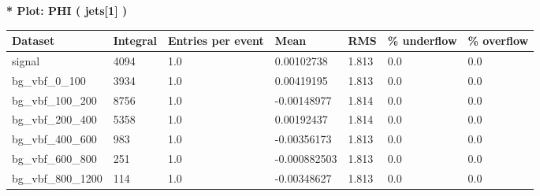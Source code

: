 \documentclass[a4paper, 10pt]{article}
\begin{document}
\textbf{* Plot: PHI ( jets[1] ) }\\
   \begin{table}[H]
  \begin{center}
    \begin{tabular}{|m{23.0mm}|m{23.0mm}|m{18.0mm}|m{19.0mm}|m{19.0mm}|m{19.0mm}|m{19.0mm}|}
      \hline
      {\cellcolor{yellow}         Dataset}& {\cellcolor{yellow}         Integral}& {\cellcolor{yellow}         Entries per event}& {\cellcolor{yellow}         Mean}& {\cellcolor{yellow}         RMS}& {\cellcolor{yellow}         \% underflow}& {\cellcolor{yellow}         \% overflow}\\
      \hline
      {\cellcolor{white}         signal}& {\cellcolor{white}         4094}& {\cellcolor{white}         1.0}& {\cellcolor{white}         0.00102738}& {\cellcolor{white}         1.813}& {\cellcolor{green}         0.0}& {\cellcolor{green}         0.0}\\
      \hline
      {\cellcolor{white}         bg\_vbf\_0\_100}& {\cellcolor{white}         3934}& {\cellcolor{white}         1.0}& {\cellcolor{white}         0.00419195}& {\cellcolor{white}         1.813}& {\cellcolor{green}         0.0}& {\cellcolor{green}         0.0}\\
      \hline
      {\cellcolor{white}         bg\_vbf\_100\_200}& {\cellcolor{white}         8756}& {\cellcolor{white}         1.0}& {\cellcolor{white}         -0.00148977}& {\cellcolor{white}         1.814}& {\cellcolor{green}         0.0}& {\cellcolor{green}         0.0}\\
      \hline
      {\cellcolor{white}         bg\_vbf\_200\_400}& {\cellcolor{white}         5358}& {\cellcolor{white}         1.0}& {\cellcolor{white}         0.00192437}& {\cellcolor{white}         1.814}& {\cellcolor{green}         0.0}& {\cellcolor{green}         0.0}\\
      \hline
      {\cellcolor{white}         bg\_vbf\_400\_600}& {\cellcolor{white}         983}& {\cellcolor{white}         1.0}& {\cellcolor{white}         -0.00356173}& {\cellcolor{white}         1.813}& {\cellcolor{green}         0.0}& {\cellcolor{green}         0.0}\\
      \hline
      {\cellcolor{white}         bg\_vbf\_600\_800}& {\cellcolor{white}         251}& {\cellcolor{white}         1.0}& {\cellcolor{white}         -0.000882503}& {\cellcolor{white}         1.813}& {\cellcolor{green}         0.0}& {\cellcolor{green}         0.0}\\
      \hline
      {\cellcolor{white}         bg\_vbf\_800\_1200}& {\cellcolor{white}         114}& {\cellcolor{white}         1.0}& {\cellcolor{white}         -0.00348627}& {\cellcolor{white}         1.813}& {\cellcolor{green}         0.0}& {\cellcolor{green}         0.0}\\

\end{tabular}
\end{center}
\end{table}
\end{document}
